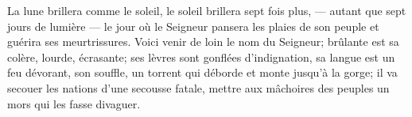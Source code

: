 La lune brillera comme le soleil, le soleil brillera sept fois plus,
	--- autant que sept jours de lumière ---
	le jour où le Seigneur pansera les plaies de son peuple
	et guérira ses meurtrissures.
Voici venir de loin le nom du Seigneur;
	brûlante est sa colère, lourde, écrasante;
	ses lèvres sont gonflées d’indignation, sa langue est un feu dévorant,
	son souffle, un torrent qui déborde et monte jusqu’à la gorge;
	il va secouer les nations d’une secousse fatale,
	mettre aux mâchoires des peuples un mors qui les fasse divaguer.
